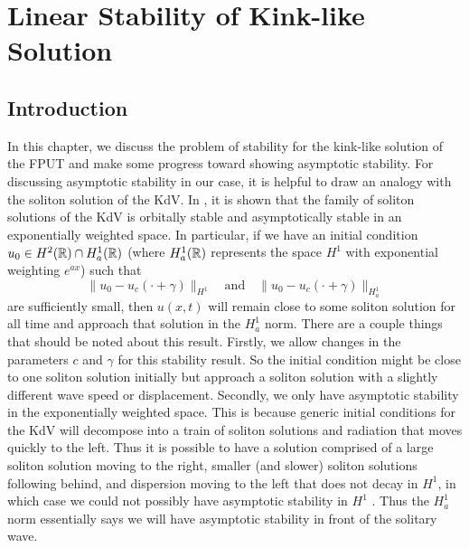\chapter{Linear Stability of Kink-like Solution}\label{chp:stability}

\section{Introduction}
In this chapter, we discuss the problem of stability for the kink-like solution of the FPUT and make some progress toward showing asymptotic stability. For discussing asymptotic stability in our case, it is helpful to draw an analogy with the soliton solution of the KdV. In \cite{pego1994asymptotic}, it is shown that the family of soliton solutions of the KdV is orbitally stable and asymptotically stable in an exponentially weighted space. In particular, if we have an initial condition \(u_0\in H^2(\mathbb{R})\cap H^1_a(\mathbb{R})\) (where \(H^1_a(\mathbb{R})\) represents the space \(H^1\) with exponential weighting \(e^{ax}\)) such that
\begin{equation*} 
	\|u_0 - u_c(\cdot + \gamma) \|_{H^1} \quad \text{and} \quad \|u_0 - u_c(\cdot + \gamma) \|_{H^1_a}
\end{equation*} 
are sufficiently small, then \(u(x,t)\) will remain close to some soliton solution for all time and approach that solution in the \(H^1_a\) norm. There are a couple things that should be noted about this result. Firstly, we allow changes in the parameters \(c\) and \(\gamma\) for this stability result. So the initial condition might be close to one soliton solution initially but approach a soliton solution with a slightly different wave speed or displacement. Secondly, we only have asymptotic stability in the exponentially weighted space. This is because generic initial conditions for the KdV will decompose into a train of soliton solutions and radiation that moves quickly to the left. Thus it is possible to have a solution comprised of a large soliton solution moving to the right, smaller (and slower) soliton solutions following behind, and dispersion moving to the left that does not decay in \(H^1\), in which case we could not possibly have asymptotic stability in \(H^1\) \cite{schuur2006asymptotic}. Thus the \(H^1_a\) norm essentially says we will have asymptotic stability in front of the solitary wave.

